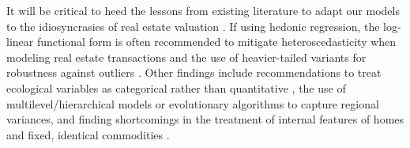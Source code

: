 \documentclass[sigconf,nonacm,11pt]{acmart}
\begin{document}
It will be critical to heed the lessons from existing literature to adapt our models to the idiosyncrasies of real estate valuation \cite{Rosen1974} \cite{Ceh2018} \cite{Bin2004}. If using hedonic regression, the log-linear functional form is often recommended to mitigate heteroscedasticity when modeling real estate transactions \cite{Morano2019} \cite{Fletcher2000} \cite{Cassel1985} and the use of heavier-tailed variants for robustness against outliers \cite{Francke2017} \cite{Gelman2007:GLM}. Other findings include recommendations to treat ecological variables as categorical rather than quantitative \cite{Anselin2006}, the use of multilevel/hierarchical models \cite{Chen2017} \cite{Gelman2007:MultilevelLinReg} \cite{Gelman2014:HierarchicalModels} \cite{Gelman2014:HierarchicalLinearModels} or evolutionary algorithms \cite{Morano2019} to capture regional variances, and finding shortcomings in the treatment of internal features of homes and fixed, identical commodities \cite{Chen2017} \cite{Chen2019} \cite{Nestico2020} \cite{Bayer2009} \cite{Wang2021} \cite{Mei2020} \cite{Sun2020} \cite{Dai2020} \cite{Kim2003} \cite{Zheng2014}.

\end{document}
